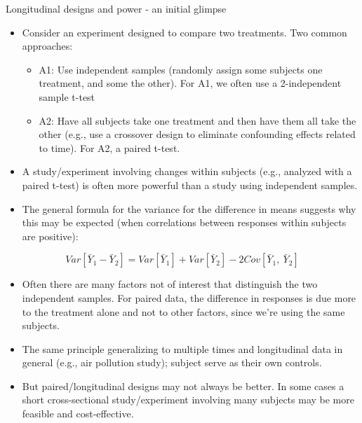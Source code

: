 \documentclass[
  9pt,
  ignorenonframetext,
]{beamer}
\providecommand{\tightlist}{%
  \setlength{\itemsep}{0pt}\setlength{\parskip}{0pt}}
\begin{document}
\begin{frame}{Longitudinal designs and power - an initial glimpse}
\protect\hypertarget{longitudinal-designs-and-power---an-initial-glimpse}{}
\begin{itemize}
\item
  Consider an experiment designed to compare two treatments. Two common
  approaches:

  \begin{itemize}
  \tightlist
  \item
    A1: Use independent samples (randomly assign some subjects one
    treatment, and some the other). For A1, we often use a 2-independent
    sample t-test
  \item
    A2: Have all subjects take one treatment and then have them all take
    the other (e.g., use a crossover design to eliminate confounding
    effects related to time). For A2, a paired t-test.
  \end{itemize}
\item
  A study/experiment involving changes within subjects (e.g., analyzed
  with a paired t-test) is often more powerful than a study using
  independent samples.
\end{itemize}
\end{frame}

\begin{frame}{}
\protect\hypertarget{section-10}{}
\begin{itemize}
\tightlist
\item
  The general formula for the variance for the difference in means
  suggests why this may be expected (when correlations between responses
  within subjects are positive):
\end{itemize}

\[
Var[\bar Y_1 - \bar Y_2] = Var[\bar Y_1] + Var[\bar Y_2] - 2Cov[\bar Y_1,\ \bar Y_2]
\]

\begin{itemize}
\tightlist
\item
  Often there are many factors not of interest that distinguish the two
  independent samples. For paired data, the difference in responses is
  due more to the treatment alone and not to other factors, since we're
  using the same subjects.\\
\item
  The same principle generalizing to multiple times and longitudinal
  data in general (e.g., air pollution study); subject serve as their
  own controls.
\item
  But paired/longitudinal designs may not always be better. In some
  cases a short cross-sectional study/experiment involving many subjects
  may be more feasible and cost-effective.
\end{itemize}
\end{frame}
\end{document}

